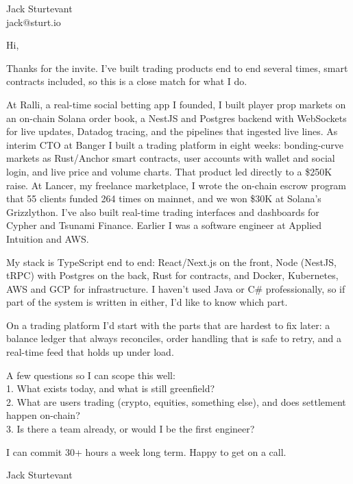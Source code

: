 \documentclass[11pt]{article}
\begin{document}
\raggedright

{\namefont\fontsize{20pt}{24pt}\selectfont Jack Sturtevant}\\[-0.3em]
jack@sturt.io

\vspace{1.2em}

Hi,

Thanks for the invite. I've built trading products end to end several times, smart contracts included, so this is a close match for what I do.

At Ralli, a real-time social betting app I founded, I built player prop markets on an on-chain Solana order book, a NestJS and Postgres backend with WebSockets for live updates, Datadog tracing, and the pipelines that ingested live lines. As interim CTO at Banger I built a trading platform in eight weeks: bonding-curve markets as Rust/Anchor smart contracts, user accounts with wallet and social login, and live price and volume charts. That product led directly to a \$250K raise. At Lancer, my freelance marketplace, I wrote the on-chain escrow program that 55 clients funded 264 times on mainnet, and we won \$30K at Solana's Grizzlython. I've also built real-time trading interfaces and dashboards for Cypher and Tsunami Finance. Earlier I was a software engineer at Applied Intuition and AWS.

My stack is TypeScript end to end: React/Next.js on the front, Node (NestJS, tRPC) with Postgres on the back, Rust for contracts, and Docker, Kubernetes, AWS and GCP for infrastructure. I haven't used Java or C\# professionally, so if part of the system is written in either, I'd like to know which part.

On a trading platform I'd start with the parts that are hardest to fix later: a balance ledger that always reconciles, order handling that is safe to retry, and a real-time feed that holds up under load.

A few questions so I can scope this well:\\
1. What exists today, and what is still greenfield?\\
2. What are users trading (crypto, equities, something else), and does settlement happen on-chain?\\
3. Is there a team already, or would I be the first engineer?

I can commit 30+ hours a week long term. Happy to get on a call.

\vspace{0.6em}
Jack Sturtevant
\end{document}
